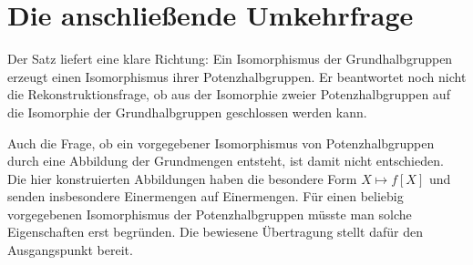\clearpage
\section*{Die anschließende Umkehrfrage}

Der Satz liefert eine klare Richtung: Ein Isomorphismus der
Grundhalbgruppen erzeugt einen Isomorphismus ihrer Potenzhalbgruppen.
Er beantwortet noch nicht die Rekonstruktionsfrage, ob aus der
Isomorphie zweier Potenzhalbgruppen auf die Isomorphie der
Grundhalbgruppen geschlossen werden kann.

Auch die Frage, ob ein vorgegebener Isomorphismus von Potenzhalbgruppen
durch eine Abbildung der Grundmengen entsteht, ist damit nicht entschieden.
Die hier konstruierten Abbildungen haben die besondere Form
\(X\mapsto f[X]\) und senden insbesondere Einermengen auf Einermengen.
Für einen beliebig vorgegebenen Isomorphismus der Potenzhalbgruppen
müsste man solche Eigenschaften erst begründen. Die bewiesene
Übertragung stellt dafür den Ausgangspunkt bereit.

\medskip\noindent\PowerIsoMainLink{}\enspace\textperiodcentered\enspace\PowerIsoProofsLink{}



